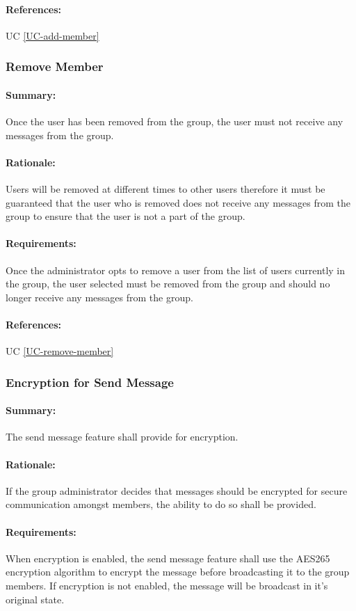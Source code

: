 \documentclass[11pt]{article}
\begin{document}
\paragraph{References:} UC \ref{UC-add-member}
\subsubsection{Remove Member} \label{FR-remove-member}
\paragraph{Summary:}
Once the user has been removed from the group, the user must not receive any messages from the group.
\paragraph{Rationale:}
Users will be removed at different times to other users therefore it must be guaranteed that the user who is removed does not receive any messages from the group to ensure that the user is not a part of the group.
\paragraph{Requirements:}
Once the administrator opts to remove a user from the list of users currently in the group, the user selected must be removed from the group and should no longer receive any messages from the group.
\paragraph{References:} UC \ref{UC-remove-member}
\subsubsection{Encryption for Send Message} \label{FR-send-message-encrypted}
\paragraph{Summary:} The send message feature shall provide for encryption.
\paragraph{Rationale:} If the group administrator decides that messages should be encrypted for secure communication amongst members, the ability to do so shall be provided.
\paragraph{Requirements:} When encryption is enabled, the send message feature shall use the AES265 encryption algorithm to encrypt the message before broadcasting it to the group members. If encryption is not enabled, the message will be broadcast in it's original state.
\end{document}
